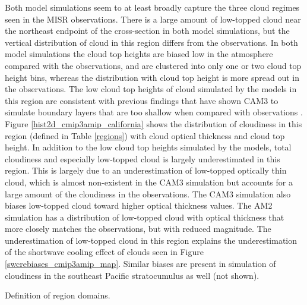 Both model simulations seem to at least broadly capture the three cloud regimes seen in the MISR observations. There is a large amount of low-topped cloud near the northeast endpoint of the cross-section in both model simulations, but the vertical distribution of cloud in this region differs from the observations. In both model simulations the cloud top heights are biased low in the atmosphere compared with the observations, and are clustered into only one or two cloud top height bins, whereas the distribution with cloud top height is more spread out in the observations. The low cloud top heights of cloud simulated by the models in this region are consistent with previous findings that have shown CAM3 to simulate boundary layers that are too shallow when compared with observations \citep{hannay_et_al_2009,medeiros_et_al_2011}. Figure \ref{hist2d_cmip3amip_california} shows the distribution of cloudiness in this region (defined in Table \ref{regions}) with cloud optical thickness and cloud top height. In addition to the low cloud top heights simulated by the models, total cloudiness and especially low-topped cloud is largely underestimated in this region. This is largely due to an underestimation of low-topped optically thin cloud, which is almost non-existent in the CAM3 simulation but accounts for a large amount of the cloudiness in the observations. The CAM3 simulation also biases low-topped cloud toward higher optical thickness values. The AM2 simulation has a distribution of low-topped cloud with optical thickness that more closely matches the observations, but with reduced magnitude. The underestimation of low-topped cloud in this region explains the underestimation of the shortwave cooling effect of clouds seen in Figure \ref{swcrebiases_cmip3amip_map}. Similar biases are present in simulation of cloudiness in the southeast Pacific stratocumulus as well (not shown).

\begin{table}
    \centering
    
    \caption{Definition of region domains.}
    \label{regions}
\end{table}

